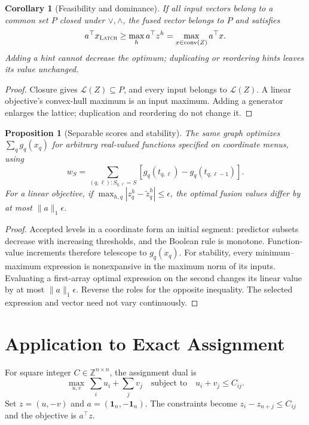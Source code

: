 \documentclass[10pt,letterpaper]{article}
\newtheorem{proposition}[theorem]{Proposition}
\newtheorem{corollary}[theorem]{Corollary}
\newcommand{\Z}{\mathbb{Z}}
\newcommand{\lat}{\mathcal{L}}
\newcommand{\one}{\mathbf{1}}
\newcommand{\LATCH}{\textsc{Latch}}
\begin{document}
\begin{corollary}[Feasibility and dominance]
If all input vectors belong to a common set $P$ closed under $\vee,\wedge$, the fused vector belongs to $P$ and satisfies
\[
 a^\top x_{\LATCH}\geq\max_h a^\top z^h
 =\max_{x\in\operatorname{conv}(Z)}a^\top x.
\]
Adding a hint cannot decrease the optimum; duplicating or reordering hints leaves its value unchanged.
\label{cor:dominance}
\end{corollary}
\begin{proof}
Closure gives $\lat(Z)\subseteq P$, and every input belongs to $\lat(Z)$. A linear objective's convex-hull maximum is an input maximum. Adding a generator enlarges the lattice; duplication and reordering do not change it.
\end{proof}

\begin{proposition}[Separable scores and stability]
The same graph optimizes $\sum_q g_q(x_q)$ for arbitrary real-valued functions specified on coordinate menus, using
\[
 w_S=\sum_{(q,\ell):S_{q,\ell}=S}
 [g_q(t_{q,\ell})-g_q(t_{q,\ell-1})].
\]
For a linear objective, if $\max_{h,q}|z^h_q-\widetilde z^h_q|\leq\epsilon$, the optimal fusion values differ by at most $\|a\|_1\epsilon$.
\end{proposition}
\begin{proof}
Accepted levels in a coordinate form an initial segment: predictor subsets decrease with increasing thresholds, and the Boolean rule is monotone. Function-value increments therefore telescope to $g_q(x_q)$. For stability, every minimum--maximum expression is nonexpansive in the maximum norm of its inputs. Evaluating a first-array optimal expression on the second changes its linear value by at most $\|a\|_1\epsilon$. Reverse the roles for the opposite inequality. The selected expression and vector need not vary continuously.
\end{proof}

\section{Application to Exact Assignment}
For square integer $C\in\Z^{n\times n}$, the assignment dual is
\begin{equation}
 \max_{u,v}\ \sum_i u_i+\sum_jv_j
 \quad\text{subject to}\quad u_i+v_j\leq C_{ij}.
 \label{eq:assignment}
\end{equation}
Set $z=(u,-v)$ and $a=(\one_n,-\one_n)$. The constraints become $z_i-z_{n+j}\leq C_{ij}$ and the objective is $a^\top z$.
\end{document}

